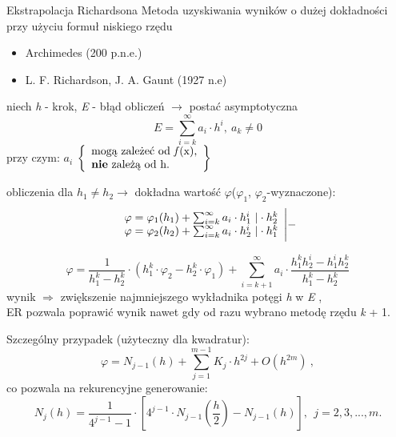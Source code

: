 	\begin{frame}{Ekstrapolacja Richardsona}
		Metoda uzyskiwania wyników o dużej dokładności przy użyciu formuł niskiego rzędu	
       
        \begin{itemize}
          \item Archimedes (200 p.n.e.)
          \item L. F. Richardson, J. A. Gaunt (1927 n.e)
        \end{itemize}
        niech	\textit{h} - krok, \textit{E} - błąd obliczeń $\rightarrow$ postać asymptotyczna
        $$
			E=\sum_{i=k}^{\infty}a_{i}\cdot h^{i},\ a_{k}\neq 0
		$$
		przy czym: $a_{i}$
         $\left\{\begin{array}{l}
  			\textnormal{mogą zależeć od \textit{f}(x),}\\
            \textnormal{\textbf{nie} zależą od h.}
        \end{array}\right\}$
   \end{frame}
   \begin{frame}
   
   obliczenia dla $h_{1}\neq h_{2}\rightarrow$ dokładna wartość $\varphi$($\varphi_{1}$, $\varphi_{2}$-wyznaczone):
		$$
        \begin{array}{l}
\varphi=\varphi_{1}(h_{1})+\sum_{i=k}^{\infty}{a_{i}}\cdot h_{1}^{i}\ \text{\textbar}\cdot h_{2}^{k}\\
\varphi=\varphi_{2}(h_{2})+\sum_{i=k}^{\infty}{a_{i}}\cdot h_{2}^{i}\ \text{\textbar}\cdot h_{1}^{k}
		\end{array}\Bigg\lvert -
        $$
        
		$$
\varphi=\frac{1}{h_{1}^{k}-h_{2}^{k}}\cdot(h_{1}^{k}\cdot\varphi_{2}-h_{2}^{k}\cdot\varphi_{1})+\sum_{i=k+1}^{\infty}a_{i}\cdot\frac{h_{1}^{k}h_{2}^{i}-h_{1}^{i}h_{2}^{k}}{h_{1}^{k}-h_{2}^{k}}
		$$
		wynik $\Rightarrow$ zwiększenie najmniejszego wykładnika potęgi \textit{h} w \textit{E} , \\
		ER pozwala poprawić wynik nawet gdy od razu wybrano metodę rzędu \textit{k} + 1.        
	\end{frame}
	\begin{frame}
		Szczególny przypadek (użyteczny dla kwadratur):
		$$
\varphi=N_{j-1}(h)+\sum_{j=1}^{m-1}K_{j}\cdot h^{2j}+O(h^{2m})\ ,
        $$
        co pozwala na rekurencyjne generowanie:   
        $$
N_{j}(h)=\displaystyle \frac{1}{4^{j-1}-1}\cdot[4^{j-1}\cdot N_{j-1}(\frac{h}{2})-N_{j-1}(h)],\ \ j=2, 3, . . ., m.
		$$
    \end{frame}





